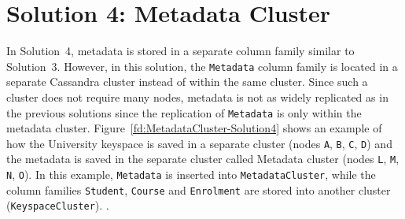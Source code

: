 \section{Solution 4:  Metadata Cluster} \label{s:design-sol4}

In Solution~4,   metadata  is stored in a separate column family similar to
Solution~3. 
However,   in this solution,   the \texttt{Metadata} column family is located in a
separate Cassandra cluster instead of  within the same cluster. 
Since such a cluster does not require many nodes,  metadata  is not as widely
replicated as in the previous solutions since the replication of
\texttt{Metadata} is only within the metadata cluster. 
Figure~\ref{fd:MetadataCluster-Solution4} shows an example of how the University
keyspace is saved in a separate cluster (nodes \texttt{A},  \texttt{B}, 
\texttt{C},   \texttt{D}) and the metadata is saved in the separate cluster
called Metadata cluster (nodes \texttt{L},  \texttt{M},  \texttt{N},   \texttt{O}). 
In this example,  \texttt{Metadata} is inserted into
\texttt{MetadataCluster},   while the column families \texttt{Student},  
\texttt{Course} and \texttt{Enrolment} are stored into another
cluster (\texttt{KeyspaceCluster}). 
. 

